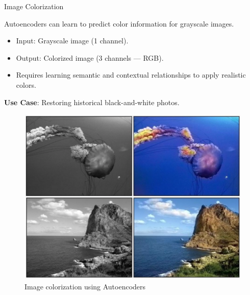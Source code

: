 \begin{frame}[allowframebreaks]{Image Colorization}

Autoencoders can learn to predict color information for grayscale images.

\begin{itemize}
    \item Input: Grayscale image (1 channel).
    \item Output: Colorized image (3 channels — RGB).
    \item Requires learning semantic and contextual relationships to apply realistic colors.
\end{itemize}

\textbf{Use Case}: Restoring historical black-and-white photos.

\framebreak

\begin{figure}
    \centering
    \includegraphics[height=0.8\textheight, width=\textwidth, keepaspectratio]{./images/autoencoders/image_colorization.png}
    \caption{Image colorization using Autoencoders}
\end{figure}

\end{frame}